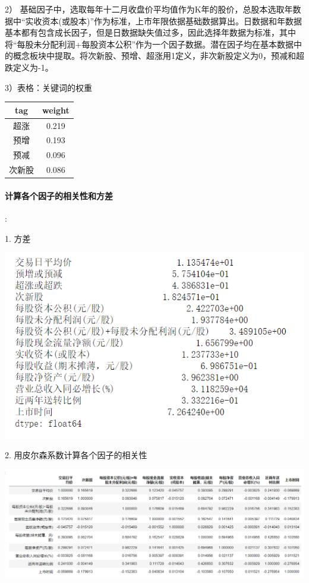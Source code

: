 \documentclass[lang=cn,12pt]{elegantpaper}
\begin{document}
2） 基础因子中，选取每年十二月收盘价平均值作为K年的股价，总股本选取年数据中“实收资本(或股本)”作为标准，上市年限依据基础数据算出。日数据和年数据基本都有包含成长因子，但是日数据缺失值过多，因此选择年数据为标准，其中将“每股未分配利润+每股资本公积”作为一个因子数据。潜在因子均在基本数据中的概念板块中提取。将次新股、预增、超涨用1定义，非次新股定义为0，预减和超跌定义为-1。

3）表格：关键词的权重

\begin{center}
\begin{tabular}{|c|c|}
	\hline
	tag & weight \\\hline
	超涨  & 0.219  \\\hline
	预增  & 0.193  \\\hline
	预减  & 0.096  \\\hline
	次新股 & 0.086 \\\hline
\end{tabular}
\end{center}

\paragraph{计算各个因子的相关性和方差}
:

1. 方差

\begin{center}
	\includegraphics[scale=0.6]{2.png}
\end{center}

\newpage

2. 用皮尔森系数计算各个因子的相关性

\begin{center}
	\includegraphics[width=1\columnwidth]{3.png}
\end{center}
\end{document}
